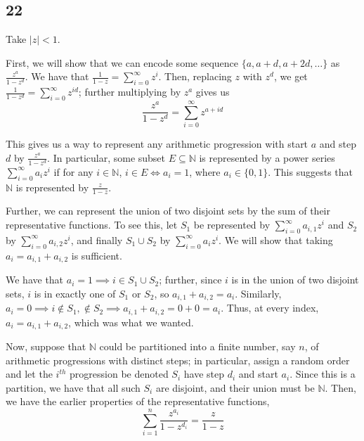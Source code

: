 \documentclass[12pt,letterpaper]{article}
\theoremstyle{definition}
\newcommand{\N}{\mathbb{N}}
\begin{document}
\subsection*{22}

Take $|z| < 1$.

First, we will show that we can encode some sequence $\{a, a+d, a+2d, \dots\}$ as $\frac{z^{a}}{1-z^{d}}$. We have that $\frac{1}{1-z} = \sum_{i=0}^{\infty}z^{i}$. Then, replacing $z$ with $z^{d}$, we get $\frac{1}{1-z^{d}} = \sum_{i=0}^{\infty}z^{id}$; further multiplying by $z^{a}$ gives us
\[
  \frac{z^{a}}{1-z^{d}} = \sum_{i=0}^{\infty}z^{a + id}
\]

This gives us a way to represent any arithmetic progression with start $a$ and step $d$ by $\frac{z^{a}}{1-z^{d}}$. In particular, some subset $E \subseteq \N$ is represented by a power series $\sum_{i=0}^{\infty}a_{i}z^{i}$ if for any $i \in \N$, $i \in E \iff a_{i} = 1$, where $a_{i} \in \{0, 1\}$. This suggests that $\N$ is represented by $\frac{z}{1-z}$.

Further, we can represent the union of two disjoint sets by the sum of their representative functions. To see this, let $S_{1}$ be represented by $\sum_{i=0}^{\infty}a_{i,1}z^{i}$ and $S_{2}$ by $\sum_{i=0}^{\infty}a_{i,2}z^{i}$, and finally $S_{1} \cup S_{2}$ by $\sum_{i=0}^{\infty}a_{i}z^{i}$. We will show that taking $a_{i} = a_{i,1} + a_{i,2}$ is sufficient.

We have that $a_{i} = 1 \implies i \in S_{1} \cup S_{2}$; further, since $i$ is in the union of two disjoint sets, $i$ is in exactly one of $S_{1}$ or $S_{2}$, so $a_{i,1} + a_{i,2} = a_{i}$. Similarly, $a_{i} = 0 \implies i \notin S_{1}, \notin S_{2} \implies a_{i,1} + a_{i,2} = 0 + 0 = a_{i}$. Thus, at every index, $a_{i} = a_{i,1} + a_{i,2}$, which was what we wanted.

Now, suppose that $\N$ could be partitioned into a finite number, say $n$, of arithmetic progressions with distinct steps; in particular, assign a random order and let the $i^{th}$ progression be denoted $S_{i}$ have step $d_{i}$ and start $a_{i}$. Since this is a partition, we have that all such $S_{i}$ are disjoint, and their union must be $\N$. Then, we have the earlier properties of the representative functions,
\[
  \sum_{i=1}^{n} \frac{z^{a_{i}}}{1-z^{d_{i}}} = \frac{z}{1-z}
\]
\end{document}
